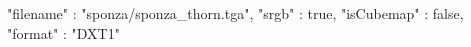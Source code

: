 { 
	"filename" : "sponza/sponza_thorn.tga", 
	"srgb" : true,
	"isCubemap" : false,
	"format" : "DXT1"
}